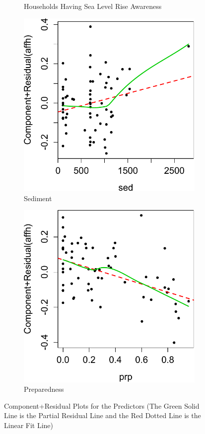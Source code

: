 \documentclass[preprint,review,12pt]{elsarticle}
\begin{document}
\begin{figure}[!htp]
\begin{subfigure}[t]{0.23\textwidth}
\caption{Households Having Sea Level Rise Awareness}
\end{subfigure}\hspace{5mm}
\begin{subfigure}[t]{0.23\textwidth}
\centering
\includegraphics[width=\linewidth, keepaspectratio]{sed.pdf}
\caption{Sediment}
\end{subfigure}
\begin{subfigure}[t]{0.23\textwidth}
\centering
\includegraphics[width=\linewidth, keepaspectratio]{prp.pdf}
\caption{Preparedness}
\end{subfigure}
\caption{Component+Residual Plots for the Predictors (The Green Solid Line is the Partial Residual Line and the Red Dotted Line is the Linear Fit Line)}
\label{cr}
\vspace*{-0.3cm}
\end{figure}
\end{document}
